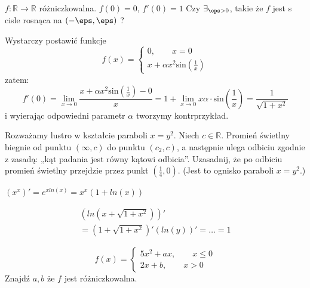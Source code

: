 \documentclass[11pt]{scrartcl}
\begin{document}
   \begin{zadanie}
       $f: \mathbb{R} \to \mathbb{R} $ różniczkowalna.
       $f(0) = 0$, $f'(0) = 1$
       Czy $\exists_{\eps > 0}$, takie że $f$ jest s cisle rosnąca na $\left ( -\eps, \eps \right )$ ? 
            
   \end{zadanie}
   Wystarczy postawić funkcje 
   \[
     f(x) = \begin{cases}
              0, \qquad x = 0 \\
              x + \alpha x^2 \text{sin} \left ( \frac{1}{x} \right ) 
            \end{cases}
   \]
   zatem:
   \[
     f'(0) = \lim_{x \to 0} \frac{x + \alpha  x^2 \text{sin} \left ( \frac{1}{x} \right ) - 0 }{x} = 1 + \lim_{x \to 0 } x \alpha \cdot \text{sin} \left ( \frac{1}{x} \right ) = \frac{1}{\sqrt{1 + x^2}}
   \]
   i wyierając odpowiedni parametr $\alpha$ tworzymy kontrprzykład.

   \begin{zaddom}
       Rozważamy lustro w kształcie paraboli $x = y^{2}$. Niech $c \in \mathbb{R} $. Promień świetlny biegnie od punktu $\left ( \infty  ,c  \right )$ do punktu $(c_{2}, c)$, a następnie ulega odbiciu zgodnie z zasadą: „kąt padania jest równy kątowi odbicia”. Uzasadnij, że po odbiciu promień świetlny przejdzie przez punkt $\left ( \frac{1}{4},0 \right )$. (Jest to ognisko paraboli $x = y^{2}$.)
   \end{zaddom}
   
\begin{przykład}
    $(x^x)' = e^{x ln \left ( x \right )} = x^x (1 + ln \left ( x \right ))$
\end{przykład}

\begin{przykład}
  \begin{gather*}
    (ln \left ( x + \sqrt{1 + x^2} \right ))' \\
    = \left ( 1 + \sqrt{1 + x^2} \right )' \left ( ln \left ( y \right ) \right )' = \dots = 1
  \end{gather*}
\end{przykład}

\begin{zadanie}
    \[
      f(x) = \begin{cases}
        5x^2 + ax, \qquad x \leq 0 \\
        2x + b, \qquad x > 0
      \end{cases}
    \]
    Znajdź $a, b$ że $f$ jest różniczkowalna.

\end{zadanie}
\end{document}
